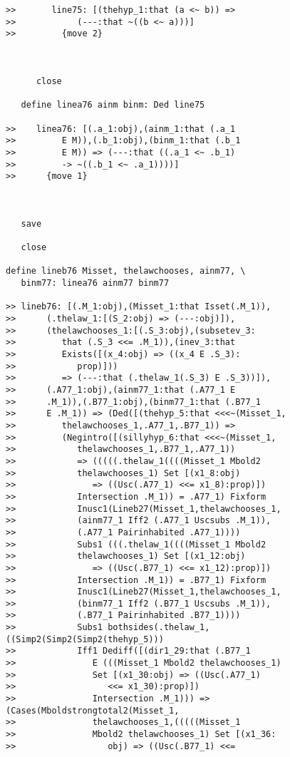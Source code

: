 \documentclass[12pt]{article}
\begin{document}
\begin{verbatim}
>>       line75: [(thehyp_1:that (a <~ b)) =>
>>            (---:that ~((b <~ a)))]
>>         {move 2}



      close

   define linea76 ainm binm: Ded line75

>>    linea76: [(.a_1:obj),(ainm_1:that (.a_1
>>         E M)),(.b_1:obj),(binm_1:that (.b_1
>>         E M)) => (---:that ((.a_1 <~ .b_1)
>>         -> ~((.b_1 <~ .a_1))))]
>>      {move 1}



   save

   close

define lineb76 Misset, thelawchooses, ainm77, \
   binm77: linea76 ainm77 binm77

>> lineb76: [(.M_1:obj),(Misset_1:that Isset(.M_1)),
>>      (.thelaw_1:[(S_2:obj) => (---:obj)]),
>>      (thelawchooses_1:[(.S_3:obj),(subsetev_3:
>>         that (.S_3 <<= .M_1)),(inev_3:that
>>         Exists([(x_4:obj) => ((x_4 E .S_3):
>>            prop)]))
>>         => (---:that (.thelaw_1(.S_3) E .S_3))]),
>>      (.A77_1:obj),(ainm77_1:that (.A77_1 E
>>      .M_1)),(.B77_1:obj),(binm77_1:that (.B77_1
>>      E .M_1)) => (Ded([(thehyp_5:that <<<~(Misset_1,
>>         thelawchooses_1,.A77_1,.B77_1)) =>
>>         (Negintro([(sillyhyp_6:that <<<~(Misset_1,
>>            thelawchooses_1,.B77_1,.A77_1))
>>            => (((((.thelaw_1((((Misset_1 Mbold2
>>            thelawchooses_1) Set [(x1_8:obj)
>>               => ((Usc(.A77_1) <<= x1_8):prop)])
>>            Intersection .M_1)) = .A77_1) Fixform
>>            Inusc1(Lineb27(Misset_1,thelawchooses_1,
>>            (ainm77_1 Iff2 (.A77_1 Uscsubs .M_1)),
>>            (.A77_1 Pairinhabited .A77_1))))
>>            Subs1 (((.thelaw_1((((Misset_1 Mbold2
>>            thelawchooses_1) Set [(x1_12:obj)
>>               => ((Usc(.B77_1) <<= x1_12):prop)])
>>            Intersection .M_1)) = .B77_1) Fixform
>>            Inusc1(Lineb27(Misset_1,thelawchooses_1,
>>            (binm77_1 Iff2 (.B77_1 Uscsubs .M_1)),
>>            (.B77_1 Pairinhabited .B77_1))))
>>            Subs1 bothsides(.thelaw_1,((Simp2(Simp2(Simp2(thehyp_5)))
>>            Iff1 Dediff([(dir1_29:that (.B77_1
>>               E (((Misset_1 Mbold2 thelawchooses_1)
>>               Set [(x1_30:obj) => ((Usc(.A77_1)
>>                  <<= x1_30):prop)])
>>               Intersection .M_1))) => (Cases(Mboldstrongtotal2(Misset_1,
>>               thelawchooses_1,(((((Misset_1
>>               Mbold2 thelawchooses_1) Set [(x1_36:
>>                  obj) => ((Usc(.B77_1) <<=

\end{verbatim}
\end{document}
